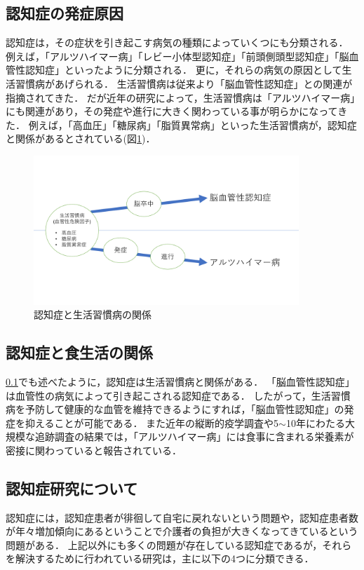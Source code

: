 \documentclass[../report]{subfiles}
\begin{document}
\subsection{認知症の発症原因} \label{sec:cause}
認知症は，その症状を引き起こす病気の種類によっていくつにも分類される．
例えば，「アルツハイマー病」「レビー小体型認知症」「前頭側頭型認知症」「脳血管性認知症」といったように分類される．
更に，それらの病気の原因として生活習慣病があげられる．
生活習慣病は従来より「脳血管性認知症」との関連が指摘されてきた．
だが近年の研究によって，生活習慣病は「アルツハイマー病」にも関連があり，その発症や進行に大きく関わっている事が明らかになってきた\cite{seikatsu}．
例えば，「高血圧」「糖尿病」「脂質異常病」といった生活習慣病が，認知症と関係があるとされている(図\ref{fig:relation-dementia-life-habit})．
\begin{figure}[htbp]
    \begin{center}
        \includegraphics[width=10cm]{imgs/1_relation-dementia-life-habit.pdf}
        \caption{認知症と生活習慣病の関係}
        \label{fig:relation-dementia-life-habit}
    \end{center}
\end{figure}


\subsection{認知症と食生活の関係} \label{sec:relation-dementia-dietary-habit}
\ref{sec:cause}でも述べたように，認知症は生活習慣病と関係がある．
「脳血管性認知症」は血管性の病気によって引き起こされる認知症である．
したがって，生活習慣病を予防して健康的な血管を維持できるようにすれば，「脳血管性認知症」の発症を抑えることが可能である．
また近年の縦断的疫学調査\cite{nutrition-dementia-00}や5$\sim$10年にわたる大規模な追跡調査\cite{nutrition-dementia-01}の結果では，「アルツハイマー病」には食事に含まれる栄養素が密接に関わっていると報告されている．


\subsection{認知症研究について}
認知症には，認知症患者が徘徊して自宅に戻れないという問題や，認知症患者数が年々増加傾向にあるということで介護者の負担が大きくなってきているという問題がある．
上記以外にも多くの問題が存在している認知症であるが，それらを解決するために行われている研究は，主に以下の4つに分類できる．
\end{document}
